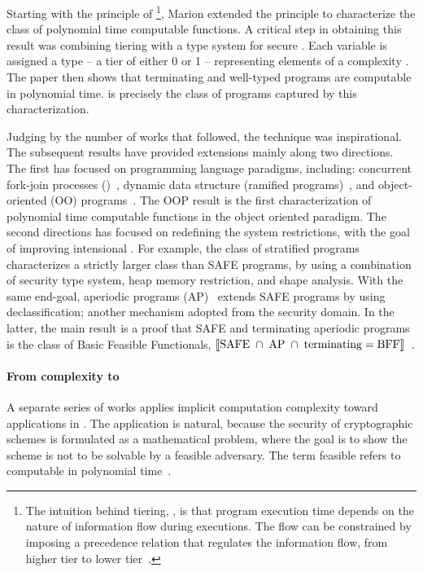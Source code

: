 Starting with the principle of {\emph{}}\footnote{
The intuition behind tiering, \aka {}, is that program execution time depends on the nature of information flow during executions.
The flow can be constrained by imposing a precedence relation that regulates the information flow,
\eg from higher tier to lower tier~\cite{leivant1995, leivant2013}.},
Marion extended the principle to characterize the class of polynomial time computable functions.
A critical step in obtaining this result was combining tiering with a type system for secure .
Each variable is assigned a type -- a {tier} of either 0 or 1 -- representing elements of a complexity .
The paper then shows that terminating and well-typed programs are computable in polynomial time.
 is precisely the class of programs captured by this characterization.

Judging by the number of works that followed, the technique was inspirational.
The subsequent results have provided extensions mainly along two directions.
The first has focused on programming language paradigms, including: 
concurrent fork-join processes ()~\cite{hainry2013},
dynamic data structure (ramified programs)~\cite{leivant2013}, and
{object-oriented (OO) programs}~\cite{hainry2015}.
The OOP result is the first characterization of polynomial time computable functions in the object oriented paradigm.
The second directions has focused on redefining the system restrictions, with the goal of improving intensional .
For example, the class of stratified programs~\cite{hainry2023} characterizes a strictly larger class than SAFE programs,
by using a combination of {security type system}, heap memory restriction, and shape analysis.
With the same end-goal, aperiodic programs (AP)~\cite{hainry2024} extends SAFE programs by using declassification;
another mechanism adopted from the security domain.
In the latter, the main result is a proof that SAFE and terminating aperiodic programs is the class of Basic Feasible Functionals, \ie \(\llbracket\text{SAFE}\;\cap\;\text{AP}\;\cap\;\text{terminating} = \text{BFF}\rrbracket\)~\cite{hainry2020,hainry2024}.

\paragraph*{From complexity to }
A separate series of works applies implicit computation complexity toward applications in .
The application is natural, because the security of cryptographic schemes is formulated as a mathematical problem, where the goal is to show the scheme is not to be solvable by a feasible adversary.
The term feasible refers to computable in polynomial time~\cite{feree2018}.


